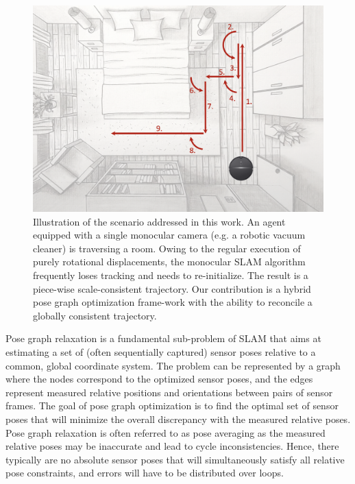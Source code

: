 \documentclass[letterpaper, 10 pt, conference]{ieeeconf}  %
\begin{document}
\begin{figure}[t]
  \centering
  \includegraphics[width=\columnwidth]{frontFigure.png}
  \caption{Illustration of the scenario addressed in this work. An agent equipped with a single monocular camera (e.g. a robotic vacuum cleaner) is traversing a room. Owing to the regular execution of purely rotational displacements, the monocular SLAM algorithm frequently loses tracking and needs to re-initialize. The result is a piece-wise scale-consistent trajectory. Our contribution is a hybrid pose graph optimization frame-work with the ability to reconcile a globally consistent trajectory.}
  \label{fig:frontFigure}
\end{figure}

Pose graph relaxation is a fundamental sub-problem of SLAM that aims at estimating a set of (often sequentially captured) sensor poses relative to a common, global coordinate system. The problem can be represented by a graph where the nodes correspond to the optimized sensor poses, and the edges represent measured relative positions and orientations between pairs of sensor frames. The goal of pose graph optimization is to find the optimal set of sensor poses that will minimize the overall discrepancy with the measured relative poses. Pose graph relaxation is often referred to as pose averaging as the measured relative poses may be inaccurate and lead to cycle inconsistencies. Hence, there typically are no absolute sensor poses that will simultaneously satisfy all relative pose constraints, and errors will have to be distributed over loops.
\end{document}
